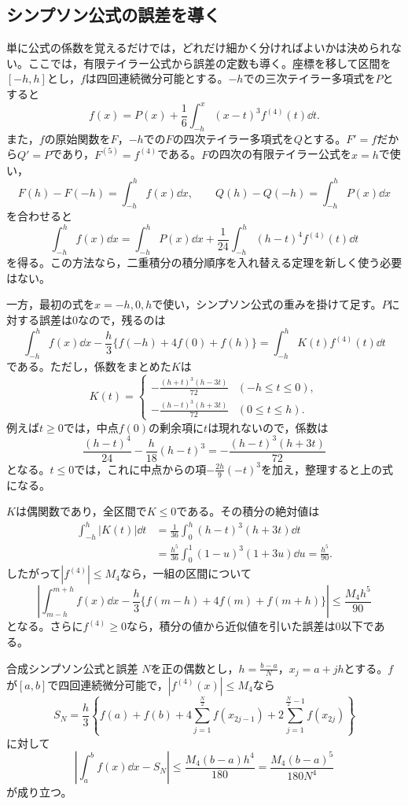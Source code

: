 \subsection{シンプソン公式の誤差を導く}

単に公式の係数を覚えるだけでは，どれだけ細かく分ければよいかは決められない。ここでは，有限テイラー公式から誤差の定数も導く。座標を移して区間を$[-h,h]$とし，$f$は四回連続微分可能とする。$-h$での三次テイラー多項式を$P$とすると
\[
 f(x)=P(x)+\frac16\int_{-h}^x(x-t)^3f^{(4)}(t)\dd t.
\]
また，$f$の原始関数を$F$，$-h$での$F$の四次テイラー多項式を$Q$とする。$F'=f$だから$Q'=P$であり，$F^{(5)}=f^{(4)}$である。$F$の四次の有限テイラー公式を$x=h$で使い，
\[
 F(h)-F(-h)=\int_{-h}^h f(x)\dd x,\qquad
 Q(h)-Q(-h)=\int_{-h}^h P(x)\dd x
\]
を合わせると
\[
 \int_{-h}^hf(x)\dd x
 =\int_{-h}^hP(x)\dd x
  +\frac1{24}\int_{-h}^h(h-t)^4f^{(4)}(t)\dd t
\]
を得る。この方法なら，二重積分の積分順序を入れ替える定理を新しく使う必要はない。

一方，最初の式を$x=-h,0,h$で使い，シンプソン公式の重みを掛けて足す。$P$に対する誤差は$0$なので，残るのは
\[
 \int_{-h}^hf(x)\dd x
 -\frac h3\{f(-h)+4f(0)+f(h)\}
 =\int_{-h}^hK(t)f^{(4)}(t)\dd t
\]
である。ただし，係数をまとめた$K$は
\[
 K(t)=
 \begin{cases}
 -\frac{(h+t)^3(h-3t)}{72}&(-h\leq t\leq0),\\[4pt]
 -\frac{(h-t)^3(h+3t)}{72}&(0\leq t\leq h).
 \end{cases}
\]
例えば$t\geq0$では，中点$f(0)$の剰余項に$t$は現れないので，係数は
\[
 \frac{(h-t)^4}{24}-\frac h{18}(h-t)^3
 =-\frac{(h-t)^3(h+3t)}{72}
\]
となる。$t\leq0$では，これに中点からの項$-\frac{2h}{9}(-t)^3$を加え，整理すると上の式になる。

$K$は偶関数であり，全区間で$K\leq0$である。その積分の絶対値は
\[
\begin{aligned}
 \int_{-h}^h|K(t)|\dd t
 &=\frac1{36}\int_0^h(h-t)^3(h+3t)\dd t\\
 &=\frac{h^5}{36}\int_0^1(1-u)^3(1+3u)\dd u
 =\frac{h^5}{90}.
\end{aligned}
\]
したがって$|f^{(4)}|\leq M_4$なら，一組の区間について
\[
 \left|\int_{m-h}^{m+h}f(x)\dd x
 -\frac h3\{f(m-h)+4f(m)+f(m+h)\}\right|
 \leq\frac{M_4h^5}{90}
\]
となる。さらに$f^{(4)}\geq0$なら，積分の値から近似値を引いた誤差は$0$以下である。

\begin{theorem}{合成シンプソン公式と誤差}
$N$を正の偶数とし，$h=\frac{b-a}{N}$，$x_j=a+jh$とする。$f$が$[a,b]$で四回連続微分可能で，$|f^{(4)}(x)|\leq M_4$なら
\[
 S_N=\frac h3\left\{f(a)+f(b)
 +4\sum_{j=1}^{\frac N2}f(x_{2j-1})
 +2\sum_{j=1}^{\frac N2-1}f(x_{2j})\right\}
\]
に対して
\[
 \left|\int_a^bf(x)\dd x-S_N\right|
 \leq\frac{M_4(b-a)h^4}{180}
 =\frac{M_4(b-a)^5}{180N^4}
\]
が成り立つ。
\end{theorem}

